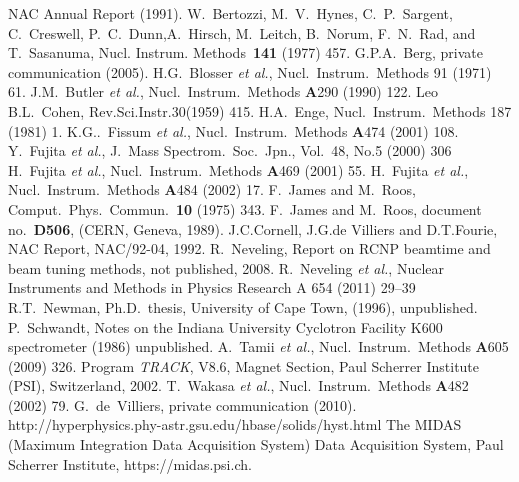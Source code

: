 \documentclass[11pt]{report}
\begin{document}
\begin{thebibliography}{abc99x}

 NAC Annual Report (1991).
 W.~Bertozzi, M.~V.~Hynes, C.~P.~Sargent, C.~Creswell, P.~C.~Dunn,A.~Hirsch, M.~Leitch, B.~Norum, F.~N.~Rad, and T.~Sasanuma, Nucl. Instrum. Methods~{\bf 141} (1977) 457.
 G.P.A.~Berg, private communication (2005).
   H.G.~Blosser {\it et al.}, Nucl.~Instrum.~Methods 91 (1971) 61.
   J.M.~Butler {\it et al.}, Nucl.~Instrum.~Methods {\bf A}290 (1990) 122.
   Leo
   B.L.~Cohen, Rev.Sci.Instr.30(1959) 415.
   H.A.~Enge, Nucl.~Instrum.~Methods  187 (1981) 1.
   K.G..~Fissum {\it et al.}, Nucl.~Instrum.~Methods {\bf A}474 (2001) 108.
   Y.~Fujita {\it et al.}, J.~Mass Spectrom.~Soc.~Jpn., Vol.~48, No.5 (2000) 306
   H.~Fujita {\it et al.}, Nucl.~Instrum.~Methods {\bf A}469 (2001) 55.
   H.~Fujita {\it et al.}, Nucl.~Instrum.~Methods {\bf A}484 (2002) 17.
   F.~James and M.~Roos, Comput.~Phys.~Commun.~{\bf 10} (1975) 343.
   F.~James and M.~Roos, document no.~{\bf D506}, (CERN, Geneva, 1989).
   J.C.Cornell, J.G.de Villiers and D.T.Fourie, NAC Report, NAC/92-04, 1992. 
   R.~Neveling, Report on RCNP beamtime and beam tuning methods, not published, 2008.
   R.~Neveling {\it et al.}, Nuclear Instruments and Methods in Physics Research A 654 (2011) 29–39
   R.T.~Newman, Ph.D.~thesis, University of Cape Town, (1996), unpublished.
   P.~Schwandt, Notes on the Indiana University Cyclotron Facility K600 spectrometer (1986) unpublished.
   A.~Tamii {\it et al.}, Nucl.~Instrum.~Methods {\bf A}605 (2009) 326.
   Program {\it TRACK}, V8.6, Magnet Section, Paul Scherrer Institute (PSI), Switzerland, 2002.
   T.~Wakasa {\it et al.}, Nucl.~Instrum.~Methods {\bf A}482 (2002) 79.
   G.~de~Villiers, private communication (2010).
   http://hyperphysics.phy-astr.gsu.edu/hbase/solids/hyst.html
   The MIDAS (Maximum Integration Data Acquisition System) Data Acquisition System, Paul Scherrer Institute, https://midas.psi.ch.

\end{thebibliography}
\end{document}
